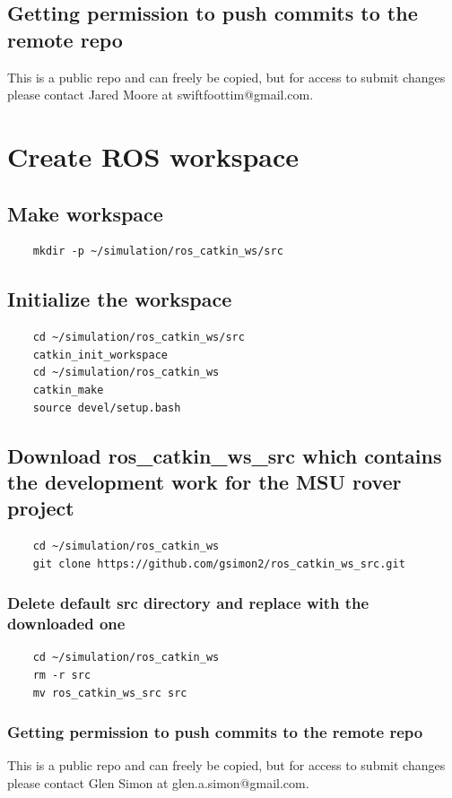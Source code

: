 \documentclass{report}
\begin{document}
\subsection{Getting permission to push commits to the remote repo}
This is a public repo and can freely be copied, but for access to submit changes please contact Jared Moore at swiftfoottim@gmail.com.



\section{Create ROS workspace}
\subsection{Make workspace}
\begin{lstlisting}
	mkdir -p ~/simulation/ros_catkin_ws/src
\end{lstlisting}

\subsection{Initialize the workspace}
\begin{lstlisting}
	cd ~/simulation/ros_catkin_ws/src
	catkin_init_workspace
	cd ~/simulation/ros_catkin_ws
	catkin_make
	source devel/setup.bash
\end{lstlisting}

\subsection{Download ros\_catkin\_ws\_src which contains the development work for the MSU rover project}
\begin{lstlisting}
	cd ~/simulation/ros_catkin_ws
	git clone https://github.com/gsimon2/ros_catkin_ws_src.git
\end{lstlisting}

\subsubsection{Delete default src directory and replace with the downloaded one}
\begin{lstlisting}
	cd ~/simulation/ros_catkin_ws
	rm -r src
	mv ros_catkin_ws_src src
\end{lstlisting}

\subsubsection{Getting permission to push commits to the remote repo}
This is a public repo and can freely be copied, but for access to submit changes please contact Glen Simon at glen.a.simon@gmail.com.
\end{document}
